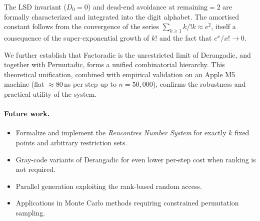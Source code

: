 \documentclass[11pt,a4paper]{article}
\newcommand{\subfact}[1]{!{#1}} %
\begin{document}
    The LSD invariant ($D_0=0$) and dead-end avoidance at $\text{remaining}=2$
    are formally characterized and integrated into the digit alphabet.
    The amortised constant follows from the convergence of the series
    $\sum_{k \geq 1} k/\subfact{k} \approx e^2$, itself a consequence of the
    super-exponential growth of $k!$ and the fact that $e^x/x! \to 0$.

    We further establish that Factoradic is the unrestricted limit of Derangadic,
    and together with Permutadic, forms a unified combinatorial hierarchy. This
    theoretical unification, combined with empirical validation on an Apple M5
    machine (flat $\approx 80$\,ns per step up to $n=50{,}000$), confirms the
    robustness and practical utility of the system.

    \paragraph{Future work.}
    \begin{itemize}[leftmargin=1.5em]
  \item Formalize and implement the \emph{Rencontres Number System} for
  exactly $k$ fixed points and arbitrary restriction sets.
  \item Gray-code variants of Derangadic for even lower per-step cost
  when ranking is not required.
  \item Parallel generation exploiting the rank-based random access.
  \item Applications in Monte Carlo methods requiring constrained
  permutation sampling.
    \end{itemize}
\end{document}
